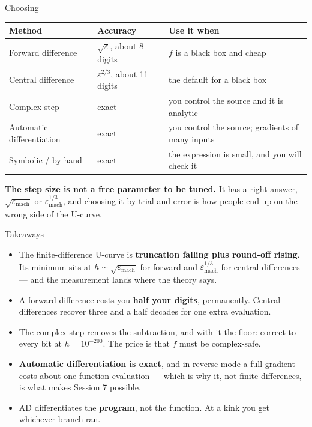 \begin{frame}{Choosing}
\renewcommand{\arraystretch}{1.2}
\begin{center}\footnotesize
\begin{tabularx}{\linewidth}{@{}>{\raggedright\arraybackslash}p{2.6cm} >{\raggedright\arraybackslash}X >{\raggedright\arraybackslash}p{3.3cm}@{}}
\toprule
\textbf{Method} & \textbf{Accuracy} & \textbf{Use it when} \\
\midrule
Forward difference & $\sqrt{\varepsilon}$, about 8 digits & $f$ is a black box and cheap \\
Central difference & $\varepsilon^{2/3}$, about 11 digits & the default for a black box \\
Complex step & exact & you control the source and it is analytic \\
Automatic differentiation & exact & you control the source; gradients of many inputs \\
Symbolic / by hand & exact & the expression is small, and you will check it \\
\bottomrule
\end{tabularx}
\end{center}
\vspace{1mm}
\begin{conceptbox}\small
\textbf{The step size is not a free parameter to be tuned.} It has a right answer, $\sqrt{\varepsilon_{\text{mach}}}$ or $\varepsilon_{\text{mach}}^{1/3}$, and choosing it by trial and error is how people end up on the wrong side of the U-curve.
\end{conceptbox}
\end{frame}

\begin{frame}{Takeaways}
\begin{takeawaybox}
\begin{itemize}\small
  \item The finite-difference U-curve is \textbf{truncation falling plus round-off rising}. Its minimum sits at $h\sim\sqrt{\varepsilon_{\text{mach}}}$ for forward and $\varepsilon_{\text{mach}}^{1/3}$ for central differences --- and the measurement lands where the theory says.
  \item A forward difference costs you \textbf{half your digits}, permanently. Central differences recover three and a half decades for one extra evaluation.
  \item The complex step removes the subtraction, and with it the floor: correct to every bit at $h=10^{-200}$. The price is that $f$ must be complex-safe.
  \item \textbf{Automatic differentiation is exact}, and in reverse mode a full gradient costs about one function evaluation --- which is why it, not finite differences, is what makes Session 7 possible.
  \item AD differentiates the \textbf{program}, not the function. At a kink you get whichever branch ran.
\end{itemize}
\end{takeawaybox}
\end{frame}

